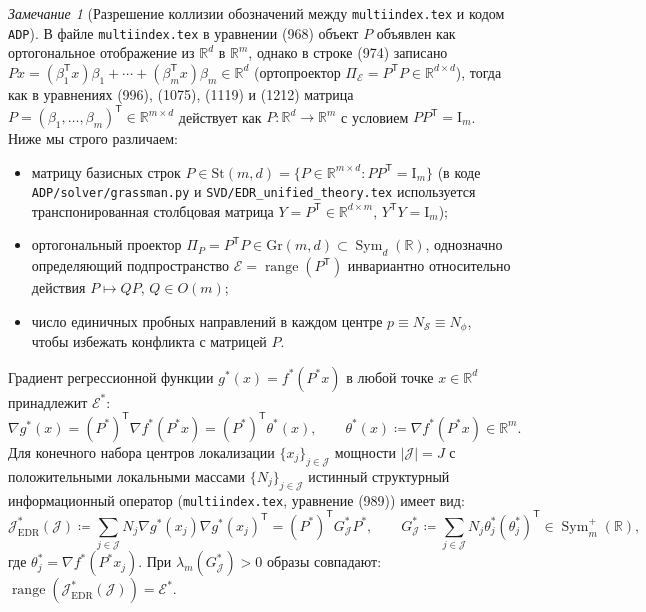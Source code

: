 \documentclass[11pt,a4paper]{article}
\newcommand{\R}{\mathbb{R}}
\newcommand{\Id}{\mathrm{I}}
\newcommand{\T}{^{\mathsf{T}}}
\newcommand{\Gr}{\mathrm{Gr}}
\newcommand{\St}{\mathrm{St}}
\newcommand{\PEDR}{P}
\newcommand{\PEDRs}{P^{*}}
\newcommand{\JEDR}{\mathcal{J}_{\mathrm{EDR}}}
\newcommand{\JJJ}{\mathcal{J}}
\newcommand{\nSph}{N_{\mathcal{S}}}
\theoremstyle{definition}
\theoremstyle{remark}
\newtheorem{remark}[theorem]{Замечание}
\begin{document}
\begin{remark}[Разрешение коллизии обозначений между \texttt{multiindex.tex} и кодом \texttt{ADP}]
В файле \texttt{multiindex.tex} в уравнении (968) объект $\PEDR$ объявлен как ортогональное отображение из $\R^d$ в $\R^m$, однако в строке (974) записано $\PEDR x = (\beta_1\T x)\beta_1 + \cdots + (\beta_m\T x)\beta_m \in \R^d$ (ортопроектор $\Pi_{\mathcal{E}} = \PEDR\T \PEDR \in \R^{d \times d}$), тогда как в уравнениях (996), (1075), (1119) и (1212) матрица $\PEDR = (\beta_1, \ldots, \beta_m)\T \in \R^{m \times d}$ действует как $\PEDR: \R^d \to \R^m$ с условием $\PEDR \PEDR\T = \Id_m$. Ниже мы строго различаем:
\begin{itemize}
    \item матрицу базисных строк $P \in \St(m,d) = \{P \in \R^{m \times d} : P P\T = \Id_m\}$ (в коде \texttt{ADP/solver/grassman.py} и \texttt{SVD/EDR\_unified\_theory.tex} используется транспонированная столбцовая матрица $Y = P\T \in \R^{d \times m}$, $Y\T Y = \Id_m$);
    \item ортогональный проектор $\Pi_P = P\T P \in \Gr(m,d) \subset \operatorname{Sym}_d(\R)$, однозначно определяющий подпространство $\mathcal{E} = \operatorname{range}(P\T)$ инвариантно относительно действия $P \mapsto Q P$, $Q \in O(m)$;
    \item число единичных пробных направлений в каждом центре $p \equiv \nSph \equiv N_\phi$, чтобы избежать конфликта с матрицей $P$.
\end{itemize}
\end{remark}

Градиент регрессионной функции $g^*(x) = f^*(\PEDRs x)$ в любой точке $x \in \R^d$ принадлежит $\mathcal{E}^*$:
\begin{equation}\label{eq:grad_chain}
    \nabla g^*(x) = (\PEDRs)\T \nabla f^*(\PEDRs x) = (\PEDRs)\T \theta^*(x), \qquad \theta^*(x) \coloneqq \nabla f^*(\PEDRs x) \in \R^m.
\end{equation}
Для конечного набора центров локализации $\{x_j\}_{j \in \JJJ}$ мощности $|\JJJ| = J$ с положительными локальными массами $\{N_j\}_{j \in \JJJ}$ истинный структурный информационный оператор (\texttt{multiindex.tex}, уравнение (989)) имеет вид:
\begin{equation}\label{eq:J_edr_true}
    \JEDR^*(\JJJ) \coloneqq \sum_{j \in \JJJ} N_j \nabla g^*(x_j)\nabla g^*(x_j)\T = (\PEDRs)\T G^*_{\JJJ} \PEDRs, \qquad G^*_{\JJJ} \coloneqq \sum_{j \in \JJJ} N_j \theta^*_j (\theta^*_j)\T \in \operatorname{Sym}_m^+(\R),
\end{equation}
где $\theta^*_j = \nabla f^*(\PEDRs x_j)$. При $\lambda_m(G^*_{\JJJ}) > 0$ образы совпадают: $\operatorname{range}(\JEDR^*(\JJJ)) = \mathcal{E}^*$.
\end{document}
